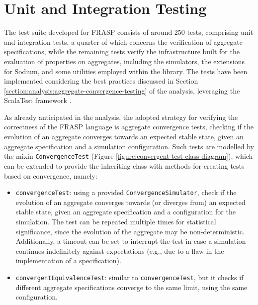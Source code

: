 
\section{Unit and Integration Testing}
\label{section:verification:unit-and-integration-testing}

The test suite developed for FRASP consists of around 250 tests, comprising
unit and integration tests, a quarter of which concerns the verification of
aggregate specifications, while the remaining tests verify the infrastructure
built for the evaluation of properties on aggregates, including the simulators,
the extensions for Sodium, and some utilities employed within the library. The
tests have been implemented considering the best practices discussed in Section
\ref{section:analysis:aggregate-convergence-testing} of the analysis,
leveraging the ScalaTest framework \cite{ScalaTest}.

As already anticipated in the analysis, the adopted strategy for verifying the
correctness of the FRASP language is aggregate convergence tests, checking if
the evolution of an aggregate converges towards an expected stable state, given
an aggregate specification and a simulation configuration. Such tests are
modelled by the mixin \texttt{ConvergenceTest} (Figure
\ref{figure:convergent-test-class-diagram}), which can be extended to provide
the inheriting class with methods for creating tests based on convergence,
namely:
\begin{itemize}
  \item \texttt{convergenceTest}: using a provided
        \texttt{ConvergenceSimulator}, check if the evolution of an aggregate
        converges towards (or diverges from) an expected stable state, given an
        aggregate specification and a configuration for the simulation. The
        test can be repeated multiple times for statistical significance, since
        the evolution of the aggregate may be non-deterministic. Additionally,
        a timeout can be set to interrupt the test in case a simulation
        continues indefinitely against expectations (e.g., due to a flaw in the
        implementation of a specification).
  \item \texttt{convergentEquivalenceTest}: similar to
        \texttt{convergenceTest}, but it checks if different aggregate
        specifications converge to the same limit, using the same
        configuration.
\end{itemize}

